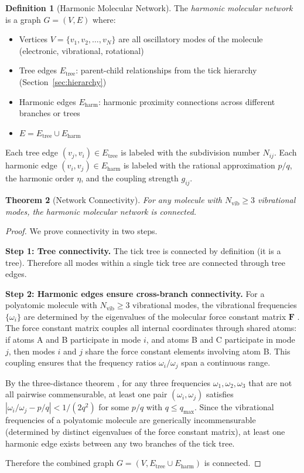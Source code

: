 \documentclass[11pt,twocolumn,a4paper]{article}
\newtheorem{theorem}{Theorem}[section]
\theoremstyle{definition}
\newtheorem{definition}[theorem]{Definition}
\theoremstyle{remark}
\newcommand{\qmax}{q_{\mathrm{max}}}
\begin{document}
\begin{definition}[Harmonic Molecular Network]
\label{def:harmonic_network}
The \emph{harmonic molecular network} is a graph $G = (V, E)$ where:
\begin{itemize}[nosep]
\item Vertices $V = \{v_1, v_2, \ldots, v_N\}$ are all oscillatory modes of the molecule (electronic, vibrational, rotational)
\item Tree edges $E_{\mathrm{tree}}$: parent-child relationships from the tick hierarchy (Section~\ref{sec:hierarchy})
\item Harmonic edges $E_{\mathrm{harm}}$: harmonic proximity connections across different branches or trees
\item $E = E_{\mathrm{tree}} \cup E_{\mathrm{harm}}$
\end{itemize}
Each tree edge $(v_j, v_i) \in E_{\mathrm{tree}}$ is labeled with the subdivision number $N_{ij}$. Each harmonic edge $(v_i, v_j) \in E_{\mathrm{harm}}$ is labeled with the rational approximation $p/q$, the harmonic order $\eta$, and the coupling strength $g_{ij}$.
\end{definition}

\begin{theorem}[Network Connectivity]
\label{thm:network_connectivity}
For any molecule with $N_{\mathrm{vib}} \geq 3$ vibrational modes, the harmonic molecular network is connected.
\end{theorem}

\begin{proof}
We prove connectivity in two steps.

\textbf{Step 1: Tree connectivity.} The tick tree is connected by definition (it is a tree). Therefore all modes within a single tick tree are connected through tree edges.

\textbf{Step 2: Harmonic edges ensure cross-branch connectivity.} For a polyatomic molecule with $N_{\mathrm{vib}} \geq 3$ vibrational modes, the vibrational frequencies $\{\omega_i\}$ are determined by the eigenvalues of the molecular force constant matrix $\mathbf{F}$ \citep{wilson1955}. The force constant matrix couples all internal coordinates through shared atoms: if atoms A and B participate in mode $i$, and atoms B and C participate in mode $j$, then modes $i$ and $j$ share the force constant elements involving atom B. This coupling ensures that the frequency ratios $\omega_i/\omega_j$ span a continuous range.

By the three-distance theorem \citep{hardy1979}, for any three frequencies $\omega_1, \omega_2, \omega_3$ that are not all pairwise commensurable, at least one pair $(\omega_i, \omega_j)$ satisfies $|\omega_i/\omega_j - p/q| < 1/(2q^2)$ for some $p/q$ with $q \leq \qmax$. Since the vibrational frequencies of a polyatomic molecule are generically incommensurable (determined by distinct eigenvalues of the force constant matrix), at least one harmonic edge exists between any two branches of the tick tree.

Therefore the combined graph $G = (V, E_{\mathrm{tree}} \cup E_{\mathrm{harm}})$ is connected.
\end{proof}
\end{document}
